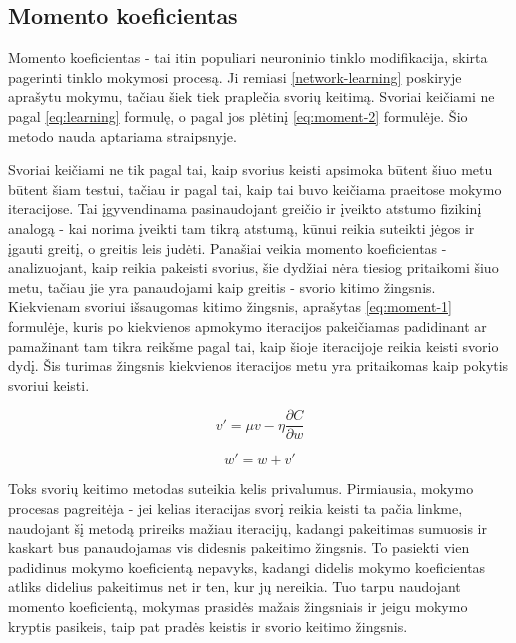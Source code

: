 \documentclass{VUMIFPSbakalaurinis}
\begin{document}
\subsection{Momento koeficientas}

Momento koeficientas - tai itin populiari neuroninio tinklo modifikacija, skirta pagerinti tinklo mokymosi procesą.
Ji remiasi \ref{network-learning} poskiryje aprašytu mokymu, tačiau šiek tiek praplečia svorių keitimą.
Svoriai keičiami ne pagal \ref{eq:learning} formulę, o pagal jos plėtinį \ref{eq:moment-2} formulėje.
Šio metodo nauda aptariama \cite{1007668} straipsnyje.

Svoriai keičiami ne tik pagal tai, kaip svorius keisti apsimoka būtent šiuo metu būtent šiam testui, tačiau ir pagal tai, kaip tai buvo keičiama praeitose mokymo iteracijose.
Tai įgyvendinama pasinaudojant greičio ir įveikto atstumo fizikinį analogą - kai norima įveikti tam tikrą atstumą, kūnui reikia suteikti jėgos ir įgauti greitį, o greitis leis judėti.
Panašiai veikia momento koeficientas - analizuojant, kaip reikia pakeisti svorius, šie dydžiai nėra tiesiog pritaikomi šiuo metu, tačiau jie yra panaudojami kaip greitis - svorio kitimo žingsnis.
Kiekvienam svoriui išsaugomas kitimo žingsnis, aprašytas \ref{eq:moment-1} formulėje, kuris po kiekvienos apmokymo iteracijos pakeičiamas padidinant ar pamažinant tam tikra reikšme pagal tai, kaip šioje iteracijoje reikia keisti svorio dydį.
Šis turimas žingsnis kiekvienos iteracijos metu yra pritaikomas kaip pokytis svoriui keisti.

\begin{equation} \label{eq:moment-1}
v' = \mu v - \eta \frac{\partial C}{\partial w}
\end{equation}

\begin{equation} \label{eq:moment-2}
w' = w + v'
\end{equation}

Toks svorių keitimo metodas suteikia kelis privalumus.
Pirmiausia, mokymo procesas pagreitėja - jei kelias iteracijas svorį reikia keisti ta pačia linkme, naudojant šį metodą prireiks mažiau iteracijų, kadangi pakeitimas sumuosis ir kaskart bus panaudojamas vis didesnis pakeitimo žingsnis.
To pasiekti vien padidinus mokymo koeficientą nepavyks, kadangi didelis mokymo koeficientas atliks didelius pakeitimus net ir ten, kur jų nereikia.
Tuo tarpu naudojant momento koeficientą, mokymas prasidės mažais žingsniais ir jeigu mokymo kryptis pasikeis, taip pat pradės keistis ir svorio keitimo žingsnis.
\end{document}
